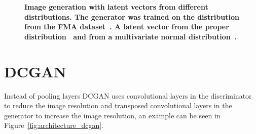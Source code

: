     \begin{figure}[ht]
        \centering
        \caption[Image generation with latent vectors from different distributions]
        {
            \textbf{Image generation with latent vectors from different distributions. The generator was trained on the distribution from the FMA dataset~\cite{FMA}. A latent vector from the proper distribution~ and from a multivariate normal distribution~.}
        }
        \label{fig:distribution}
    \end{figure}
    
    \section{DCGAN}

        Instead of pooling layers DCGAN uses convolutional layers in the discriminator to reduce the image resolution and transposed convolutional layers in the generator to increase the image resolution, an example can be seen in Figure~\ref{fig:architecture_dcgan}.
        
